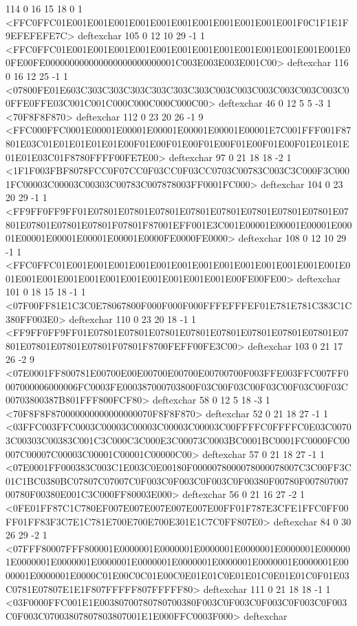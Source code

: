 114 0 16 15 18 0 1 {{<FFC0FFC01E001E001E001E001E001E001E001E001E001E001E001F0C1F1E1F9EFEFEFE7C>}} deftexchar
105 0 12 10 29 -1 1 {{<FFC0FFC01E001E001E001E001E001E001E001E001E001E001E001E001E001E00FE00FE000000000000000000000000001C003E003E003E001C00>}} deftexchar
116 0 16 12 25 -1 1 {{<07800FE01E603C303C303C303C303C303C303C003C003C003C003C003C003C00FFE0FFE03C001C001C000C000C000C000C00>}} deftexchar
46 0 12 5 5 -3 1 {{<70F8F8F870>}} deftexchar
112 0 23 20 26 -1 9 {{<FFC000FFC0001E00001E00001E00001E00001E00001E00001E7C001FFF001F87801E03C01E01E01E01E01E00F01E00F01E00F01E00F01E00F01E00F01E01E01E01E01E03C01F8780FFFF00FE7E00>}} deftexchar
97 0 21 18 18 -2 1 {{<1F1F003FBF8078FCC0F07CC0F03CC0F03CC0703C00783C003C3C000F3C0001FC00003C00003C00303C00783C007878003FF0001FC000>}} deftexchar
104 0 23 20 29 -1 1 {{<FF9FF0FF9FF01E07801E07801E07801E07801E07801E07801E07801E07801E07801E07801E07801E07801F07801F87001EFF001E3C001E00001E00001E00001E00001E00001E00001E00001E00001E0000FE0000FE0000>}} deftexchar
108 0 12 10 29 -1 1 {{<FFC0FFC01E001E001E001E001E001E001E001E001E001E001E001E001E001E001E001E001E001E001E001E001E001E001E001E001E00FE00FE00>}} deftexchar
101 0 18 15 18 -1 1 {{<07F00FF81E1C3C0E78067800F000F000F000FFFEFFFEF01E781E781C383C1C380FF003E0>}} deftexchar
110 0 23 20 18 -1 1 {{<FF9FF0FF9FF01E07801E07801E07801E07801E07801E07801E07801E07801E07801E07801E07801E07801F07801F8700FEFF00FE3C00>}} deftexchar
103 0 21 17 26 -2 9 {{<07E0001FF800781E00700E00E00700E00700E00700700F003FFE003FFC007FF0007000006000006FC0003FE000387000703800F03C00F03C00F03C00F03C00F03C00703800387B801FFF800FCF80>}} deftexchar
58 0 12 5 18 -3 1 {{<70F8F8F870000000000000000070F8F8F870>}} deftexchar
52 0 21 18 27 -1 1 {{<03FFC003FFC0003C00003C00003C00003C00003C00FFFFC0FFFFC0E03C00703C00303C00383C001C3C000C3C000E3C00073C0003BC0001BC0001FC0000FC00007C00007C00003C00001C00001C00000C00>}} deftexchar
57 0 21 18 27 -1 1 {{<07E0001FF000383C003C1E003C0E00180F0000078000078000078007C3C00FF3C01C1BC0380BC07807C07007C0F003C0F003C0F003C0F00380F00780F00780700700780F00380E001C3C000FF80003E000>}} deftexchar
56 0 21 16 27 -2 1 {{<0FE01FF87C1C780EF007E007E007E007E007E00FF01F787E3CFE1FFC0FF00FF01FF83F3C7E1C781E700E700E700E301E1C7C0FF807E0>}} deftexchar
84 0 30 26 29 -2 1 {{<07FFF80007FFF800001E0000001E0000001E0000001E0000001E0000001E0000001E0000001E0000001E0000001E0000001E0000001E0000001E0000001E0000001E0000001E0000001E0000C01E00C0C01E00C0E01E01C0E01E01C0E01E01C0F01E03C0781E07807E1E1F807FFFFF807FFFFF80>}} deftexchar
111 0 21 18 18 -1 1 {{<03F0000FFC001E1E00380700780780700380F003C0F003C0F003C0F003C0F003C0F003C07003807807803807001E1E000FFC0003F000>}} deftexchar
